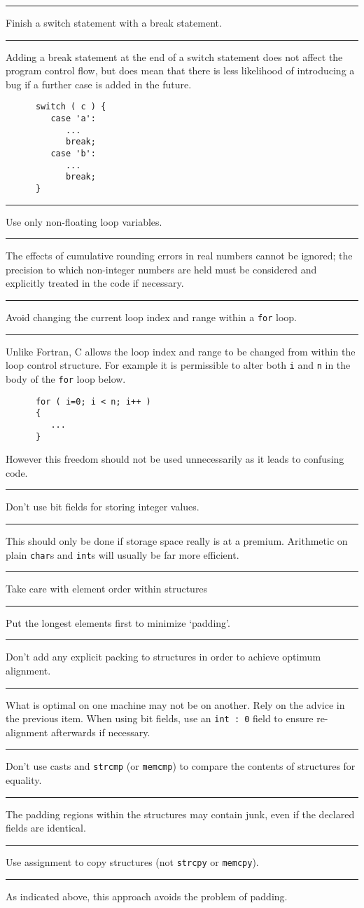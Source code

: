 \documentclass[twoside,11pt]{article}
\newcounter{sruleno}
\newcommand{\srule}[1]{
    \addtocounter{sruleno}{1}
    \goodbreak
    \rule[0.5ex]{\textwidth}{0.3mm}
    {\Large #1 \hfill {\thesruleno}}
    \rule[0.5ex]{\textwidth}{0.1mm}
}
\newcommand{\srule}[1]{
       \addtocounter{sruleno}{1}
       \begin{rawhtml} <HR> \end{rawhtml}
       {\Large \thesruleno}~~~~{\Large #1}
       \begin{rawhtml} <HR> \end{rawhtml}
       \end{tabular}
  }
\begin{document}
\srule{Finish a switch statement with a break statement.}
Adding a break statement at the end of a switch statement does not
affect the program control flow, but does mean that there
is less likelihood of introducing a bug if a further case is added
in the future.
\begin{verbatim}
      switch ( c ) {
         case 'a':
            ...
            break;
         case 'b':
            ...
            break;
      }
\end{verbatim}


\srule{Use only non-floating loop variables.}
The effects of cumulative rounding errors in real numbers cannot be ignored;
the precision to which non-integer numbers are held must be considered and
explicitly treated in the code if necessary.


\srule{Avoid changing the current loop index and range within a
{\tt for} loop.}
Unlike Fortran, C allows the loop index  and range to be changed
from within the loop control structure.
For example it is permissible to alter both {\tt i} and {\tt n}
in the body of the {\tt for} loop below.
\begin{verbatim}
      for ( i=0; i < n; i++ )
      {
         ...
      }
\end{verbatim}
However this freedom should not be used unnecessarily as it leads to
confusing code.



\srule{Don't use bit fields for storing integer values.}
This should only be done if storage space
really is at a premium. Arithmetic on plain \verb~char~s and
\verb~int~s will usually be far more efficient.

\srule{Take care with element order within structures}
Put the longest elements first to minimize `padding'.

\srule{Don't add any explicit packing to structures in order to achieve optimum
alignment.}
What is optimal on one machine may not be on another. Rely
on the advice in the previous item.
When using bit fields, use an {\tt int~:~0}
field to ensure re-alignment afterwards if necessary.



\srule{Don't use casts and {\tt strcmp} (or {\tt memcmp}) to compare the contents of
structures for equality.}
The padding regions within the structures may
contain junk, even if the declared fields are identical.

\srule{Use assignment to copy structures (not {\tt strcpy} or {\tt memcpy}).}
As indicated above, this approach avoids the problem of padding.
\end{document}
